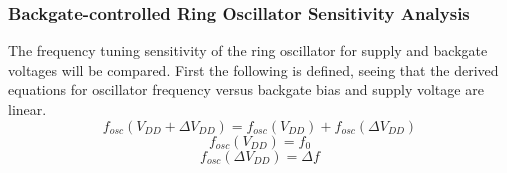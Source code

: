 

		\subsubsection{Backgate-controlled Ring Oscillator Sensitivity Analysis}\label{sec:sens_analysis}
		The frequency tuning sensitivity of the ring oscillator for supply and backgate voltages will be compared. First the following is defined, seeing that the derived equations for oscillator frequency versus backgate bias and supply voltage are linear.
		\begin{equation}
			f_{osc}(V_{DD}+\Delta V_{DD}) = f_{osc}(V_{DD}) + f_{osc}(\Delta V_{DD})
		\end{equation}
		\begin{equation}
			f_{osc}(V_{DD}) = f_0
		\end{equation}
		\begin{equation}
			f_{osc}(\Delta V_{DD}) = \Delta f
		\end{equation}

